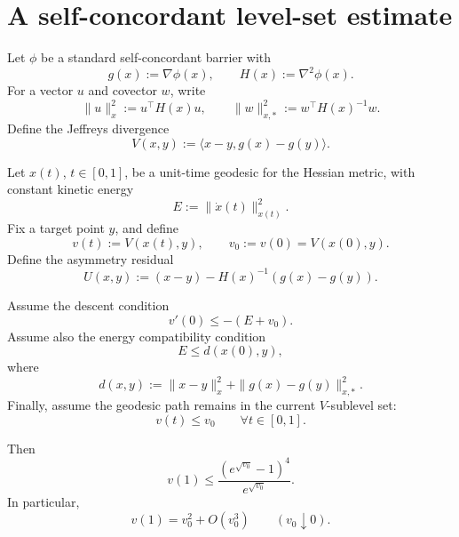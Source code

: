 \documentclass[11pt]{article}
\begin{document}
\section{A self-concordant level-set estimate}

Let \(\phi\) be a standard self-concordant barrier with
\[
    g(x):=\nabla \phi(x),
    \qquad
    H(x):=\nabla^2\phi(x).
\]
For a vector \(u\) and covector \(w\), write
\[
    \|u\|_x^2:=u^\top H(x)u,
    \qquad
    \|w\|_{x,*}^2:=w^\top H(x)^{-1}w.
\]
Define the Jeffreys divergence
\[
    V(x,y):=\langle x-y,g(x)-g(y)\rangle .
\]

Let \(x(t)\), \(t\in[0,1]\), be a unit-time geodesic for the Hessian metric, with constant kinetic energy
\[
    E:=\|\dot x(t)\|_{x(t)}^2.
\]
Fix a target point \(y\), and define
\[
    v(t):=V(x(t),y),
    \qquad
    v_0:=v(0)=V(x(0),y).
\]
Define the asymmetry residual
\[
    U(x,y):=(x-y)-H(x)^{-1}(g(x)-g(y)).
\]

Assume the descent condition
\[
    v'(0)\le -(E+v_0).
\]
Assume also the energy compatibility condition
\[
    E\le d(x(0),y),
\]
where
\[
    d(x,y)
    :=
    \|x-y\|_x^2
    +
    \|g(x)-g(y)\|_{x,*}^2.
\]
Finally, assume the geodesic path remains in the current \(V\)-sublevel set:
\[
    v(t)\le v_0
    \qquad
    \forall t\in[0,1].
\]

Then
\[
    v(1)
    \le
    \frac{(e^{\sqrt{v_0}}-1)^4}{e^{\sqrt{v_0}}}.
\]
In particular,
\[
    v(1)=v_0^2+O(v_0^3)
    \qquad
    (v_0\downarrow0).
\]
\end{document}
